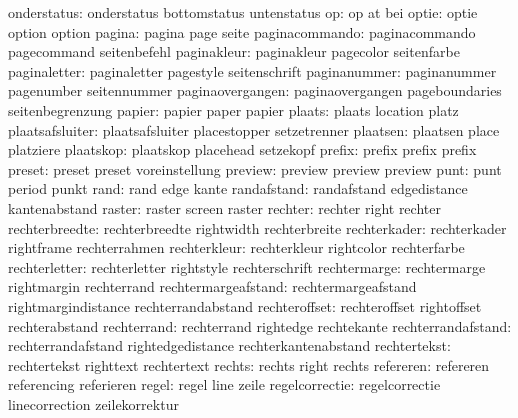         onderstatus:  onderstatus          bottomstatus        untenstatus
                 op:  op                   at                  bei
              optie:  optie                option              option
             pagina:  pagina               page                seite
     paginacommando:  paginacommando       pagecommand         seitenbefehl
        paginakleur:  paginakleur          pagecolor           seitenfarbe
       paginaletter:  paginaletter         pagestyle           seitenschrift
       paginanummer:  paginanummer         pagenumber          seitennummer
   paginaovergangen:  paginaovergangen     pageboundaries      seitenbegrenzung
             papier:  papier               paper               papier
             plaats:  plaats               location            platz
    plaatsafsluiter:  plaatsafsluiter      placestopper        setzetrenner
           plaatsen:  plaatsen             place               platziere
          plaatskop:  plaatskop            placehead           setzekopf
             prefix:  prefix               prefix              prefix
             preset:  preset               preset              voreinstellung
            preview:  preview              preview             preview
               punt:  punt                 period              punkt
               rand:  rand                 edge                kante
        randafstand:  randafstand          edgedistance        kantenabstand
             raster:  raster               screen              raster
            rechter:  rechter              right               rechter
     rechterbreedte:  rechterbreedte       rightwidth          rechterbreite
       rechterkader:  rechterkader         rightframe          rechterrahmen
       rechterkleur:  rechterkleur         rightcolor          rechterfarbe
      rechterletter:  rechterletter        rightstyle          rechterschrift
       rechtermarge:  rechtermarge         rightmargin         rechterrand
rechtermargeafstand:  rechtermargeafstand  rightmargindistance rechterrandabstand
      rechteroffset:  rechteroffset        rightoffset         rechterabstand
        rechterrand:  rechterrand          rightedge           rechtekante
 rechterrandafstand:  rechterrandafstand   rightedgedistance   rechterkantenabstand
       rechtertekst:  rechtertekst         righttext           rechtertext
             rechts:  rechts               right               rechts
          refereren:  refereren            referencing         referieren
              regel:  regel                line                zeile
     regelcorrectie:  regelcorrectie       linecorrection      zeilekorrektur
